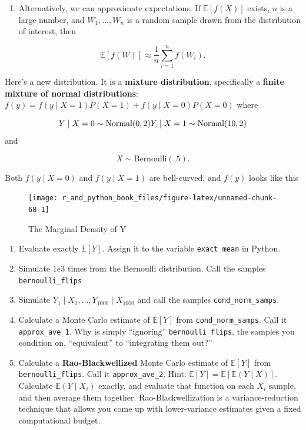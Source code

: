 \documentclass[
  12pt,
  krantz2]{krantz}
\providecommand{\tightlist}{%
  \setlength{\itemsep}{0pt}\setlength{\parskip}{0pt}}
\begin{document}
\begin{enumerate}
\def\labelenumi{\arabic{enumi}.}
\setcounter{enumi}{3}
\tightlist
\item
  Alternatively, we can approximate expectations. If \(\mathbb{E}[f(X)]\) exists, \(n\) is a large number, and \(W_1, \ldots, W_n\) is a random sample drawn from the distribution of interest, then
\end{enumerate}

\begin{equation} 
\mathbb{E}[f(W)] \approx \frac{1}{n}\sum_{i=1}^n f(W_i).
\end{equation}

Here's a new distribution. It is a \textbf{mixture distribution}, specifically a \textbf{finite mixture of normal distributions}: \(f(y) = f(y \mid X=1)P(X=1) + f(y \mid X=0)P(X=0)\) where

\begin{equation} 
Y \mid X=0 \sim \text{Normal}(0, 2) \\
Y \mid X=1 \sim \text{Normal}(10, 2)
\end{equation}
and

\begin{equation} 
X \sim \text{Bernoulli}(.5).
\end{equation}

Both \(f(y \mid X=0)\) and \(f(y \mid X=1)\) are bell-curved, and \(f(y)\) looks like this

\begin{figure}

{\centering \texttt{[image: r\_and\_python\_book\_files/figure-latex/unnamed-chunk-68-1]} 

}

\caption{The Marginal Density of Y}\label{fig:unnamed-chunk-68}
\end{figure}

\begin{enumerate}
\def\labelenumi{\alph{enumi}.}
\item
  Evaluate exactly \(\mathbb{E}[Y]\). Assign it to the variable \texttt{exact\_mean} in Python.
\item
  Simulate \(1e3\) times from the Bernoulli distribution. Call the samples \texttt{bernoulli\_flips}
\item
  Simulate \(Y_1 \mid X_1, \ldots, Y_{1000} \mid X_{1000}\) and call the samples \texttt{cond\_norm\_samps}.
\item
  Calculate a Monte Carlo estimate of \(\mathbb{E}[Y]\) from \texttt{cond\_norm\_samps}. Call it \texttt{approx\_ave\_1}. Why is simply ``ignoring'' \texttt{bernoulli\_flips}, the samples you condition on, ``equivalent'' to ``integrating them out?''
\item
  Calculate a \textbf{Rao-Blackwellized} Monte Carlo estimate of \(\mathbb{E}[Y]\) from \texttt{bernoulli\_flips}. Call it \texttt{approx\_ave\_2}. Hint: \(\mathbb{E}[Y] = \mathbb{E}[\mathbb{E}(Y \mid X) ]\). Calculate \(\mathbb{E}(Y \mid X_i)\) exactly, and evaluate that function on each \(X_i\) sample, and then average them together. Rao-Blackwellization is a variance-reduction technique that allows you come up with lower-variance estimates given a fixed computational budget.
\end{enumerate}
\end{document}
